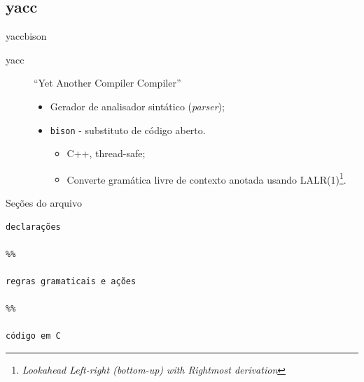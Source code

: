 \subsection{yacc}

\begin{frame}{yacc}{bison}
  \begin{description}
  \item[yacc]  ``Yet Another Compiler Compiler''
    \begin{itemize}
    \item Gerador de analisador sintático ({\it parser\/});
    \item \alert{\tt bison} - substituto de código aberto.
      \begin{itemize}
      \item C++, thread-safe;
      \item Converte gramática livre de contexto anotada usando
        LALR(1)\footnote{{\it Lookahead Left-right (bottom-up) with
          Rightmost derivation\/}}.
      \end{itemize}
    \end{itemize}
  \end{description}
\end{frame}


\begin{frame}[fragile]{Seções do arquivo}
\begin{lstlisting}
declarações

%%

regras gramaticais e ações

%%

código em C

\end{lstlisting}
\end{frame}

